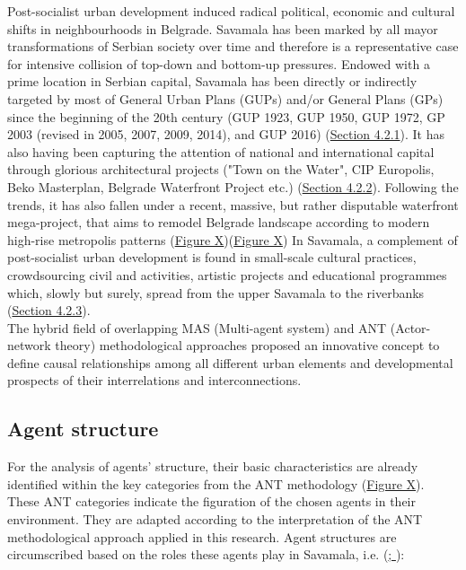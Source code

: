 \documentclass[11pt]{report}
\begin{document}
Post-socialist urban development induced radical political, economic and cultural shifts in neighbourhoods in Belgrade. Savamala has been marked by all mayor transformations of Serbian society over time and therefore is a representative case for intensive collision of top-down and bottom-up pressures.
Endowed with a prime location in Serbian capital, Savamala has been directly or indirectly targeted by most of General Urban Plans (GUPs) and/or General Plans (GPs) since the beginning of the 20th century (GUP 1923, GUP 1950, GUP 1972, GP 2003 (revised in 2005, 2007, 2009, 2014), and GUP 2016) (\href{Section 4.2.1}{Section 4.2.1}).
It has also having been capturing the attention of national and international capital through glorious architectural projects ("Town on the Water", CIP Europolis, Beko Masterplan, Belgrade Waterfront Project etc.) (\href{Section 4.2.2}{Section 4.2.2}).
Following the trends, it has also fallen under a recent, massive, but rather disputable waterfront mega-project, that aims to remodel Belgrade landscape according to modern high-rise metropolis patterns (\href{FigureX}{Figure X})(\href{FigureX}{Figure X})
In Savamala, a complement of post-socialist urban development is found in small-scale cultural practices, crowdsourcing civil and  activities, artistic projects and educational programmes which, slowly but surely, spread from the upper Savamala to the riverbanks (\href{Section 4.2.3}{Section 4.2.3}).
\\

The hybrid field of overlapping MAS (Multi-agent system) and ANT (Actor-network theory) methodological approaches proposed an innovative concept to define causal relationships among all different urban elements and developmental prospects of their interrelations and interconnections.

\subsection{Agent structure}

For the analysis of agents' structure, their basic characteristics are already identified within the key categories from the ANT methodology (\href{FigureX}{Figure X}).
These ANT categories indicate the figuration of the chosen agents in their environment. They are adapted according to the interpretation of the ANT methodological approach applied in this research.
Agent structures are circumscribed based on the roles these agents play in Savamala, i.e. (\href{Cvetinovic}{\cite{CvetinovicEtAl.2016b}; \cite{CvetinovicEtAl.2016a}}): %
\end{document}
